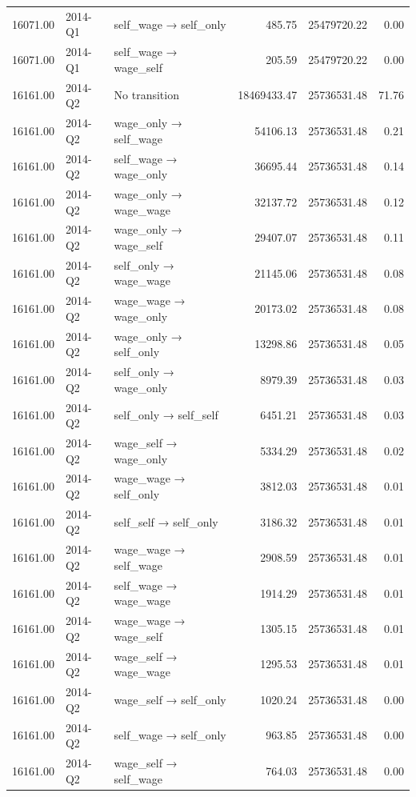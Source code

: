 \begin{table}[ht]
{\begin{tabular}{rllrrr}
  16071.00 & 2014-Q1 & self\_wage → self\_only & 485.75 & 25479720.22 & 0.00 \\ 
  16071.00 & 2014-Q1 & self\_wage → wage\_self & 205.59 & 25479720.22 & 0.00 \\ 
  16161.00 & 2014-Q2 & No transition & 18469433.47 & 25736531.48 & 71.76 \\ 
  16161.00 & 2014-Q2 & wage\_only → self\_wage & 54106.13 & 25736531.48 & 0.21 \\ 
  16161.00 & 2014-Q2 & self\_wage → wage\_only & 36695.44 & 25736531.48 & 0.14 \\ 
  16161.00 & 2014-Q2 & wage\_only → wage\_wage & 32137.72 & 25736531.48 & 0.12 \\ 
  16161.00 & 2014-Q2 & wage\_only → wage\_self & 29407.07 & 25736531.48 & 0.11 \\ 
  16161.00 & 2014-Q2 & self\_only → wage\_wage & 21145.06 & 25736531.48 & 0.08 \\ 
  16161.00 & 2014-Q2 & wage\_wage → wage\_only & 20173.02 & 25736531.48 & 0.08 \\ 
  16161.00 & 2014-Q2 & wage\_only → self\_only & 13298.86 & 25736531.48 & 0.05 \\ 
  16161.00 & 2014-Q2 & self\_only → wage\_only & 8979.39 & 25736531.48 & 0.03 \\ 
  16161.00 & 2014-Q2 & self\_only → self\_self & 6451.21 & 25736531.48 & 0.03 \\ 
  16161.00 & 2014-Q2 & wage\_self → wage\_only & 5334.29 & 25736531.48 & 0.02 \\ 
  16161.00 & 2014-Q2 & wage\_wage → self\_only & 3812.03 & 25736531.48 & 0.01 \\ 
  16161.00 & 2014-Q2 & self\_self → self\_only & 3186.32 & 25736531.48 & 0.01 \\ 
  16161.00 & 2014-Q2 & wage\_wage → self\_wage & 2908.59 & 25736531.48 & 0.01 \\ 
  16161.00 & 2014-Q2 & self\_wage → wage\_wage & 1914.29 & 25736531.48 & 0.01 \\ 
  16161.00 & 2014-Q2 & wage\_wage → wage\_self & 1305.15 & 25736531.48 & 0.01 \\ 
  16161.00 & 2014-Q2 & wage\_self → wage\_wage & 1295.53 & 25736531.48 & 0.01 \\ 
  16161.00 & 2014-Q2 & wage\_self → self\_only & 1020.24 & 25736531.48 & 0.00 \\ 
  16161.00 & 2014-Q2 & self\_wage → self\_only & 963.85 & 25736531.48 & 0.00 \\ 
  16161.00 & 2014-Q2 & wage\_self → self\_wage & 764.03 & 25736531.48 & 0.00 \\ 

\end{tabular}}
\end{table}
